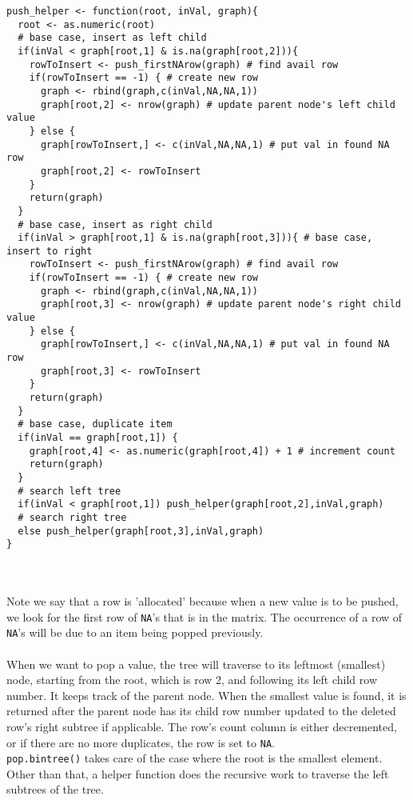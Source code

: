\documentclass{article}
\begin{document}
\begin{lstlisting}
push_helper <- function(root, inVal, graph){
  root <- as.numeric(root)
  # base case, insert as left child
  if(inVal < graph[root,1] & is.na(graph[root,2])){
    rowToInsert <- push_firstNArow(graph) # find avail row
    if(rowToInsert == -1) { # create new row
      graph <- rbind(graph,c(inVal,NA,NA,1))
      graph[root,2] <- nrow(graph) # update parent node's left child value
    } else {
      graph[rowToInsert,] <- c(inVal,NA,NA,1) # put val in found NA row
      graph[root,2] <- rowToInsert
    }
    return(graph)
  }
  # base case, insert as right child
  if(inVal > graph[root,1] & is.na(graph[root,3])){ # base case, insert to right
    rowToInsert <- push_firstNArow(graph) # find avail row
    if(rowToInsert == -1) { # create new row
      graph <- rbind(graph,c(inVal,NA,NA,1))
      graph[root,3] <- nrow(graph) # update parent node's right child value
    } else {
      graph[rowToInsert,] <- c(inVal,NA,NA,1) # put val in found NA row
      graph[root,3] <- rowToInsert
    }
    return(graph)
  }
  # base case, duplicate item
  if(inVal == graph[root,1]) {
    graph[root,4] <- as.numeric(graph[root,4]) + 1 # increment count
    return(graph)
  }
  # search left tree
  if(inVal < graph[root,1]) push_helper(graph[root,2],inVal,graph)
  # search right tree
  else push_helper(graph[root,3],inVal,graph)
}
\end{lstlisting}
\\\\ Note we say that a row is 'allocated' because when a new value is to be pushed, we look for the first row of \texttt{NA}'s that is in the matrix. The occurrence of a row of \texttt{NA}'s will be due to an item being popped previously.
\\\\ When we want to pop a value, the tree will traverse to its leftmost (smallest) node, starting from the root, which is row 2, and following its left child row number. It keeps track of the parent node. When the smallest value is found, it is returned after the parent node has its child row number updated to the deleted row's right subtree if applicable. The row's count column is either decremented, or if there are no more duplicates, the row is set to \texttt{NA}.
\\ \texttt{pop.bintree()} takes care of the case where the root is the smallest element. Other than that, a helper function does the recursive work to traverse the left subtrees of the tree.
\end{document}
